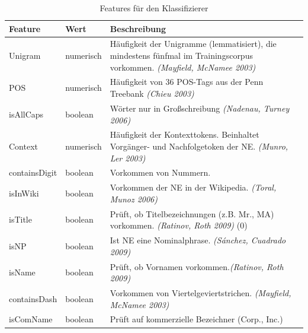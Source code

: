 \documentclass[a4paper, 11pt]{article}
\begin{document}
\begin{table}
 				\begin{tabularx}{\textwidth}{llX}
 					\toprule
 					Feature & Wert & Beschreibung\\
 					\midrule
 					Unigram & numerisch & Häufigkeit der Unigramme (lemmatisiert), die mindestens fünfmal im Trainingscorpus vorkommen. \textit{(Mayfield, McNamee 2003)} \\
 					POS & numerisch  & Häufigkeit von 36 POS-Tags aus der Penn Treebank \textit{(Chieu 2003)} \\
 					isAllCaps & boolean & Wörter nur in Großschreibung \textit{(Nadenau, Turney 2006)} \\
 					Context & numerisch & Häufigkeit der Kontexttokens. Beinhaltet Vorgänger- und Nachfolgetoken der NE. \textit{(Munro, Ler 2003)}  \\
 					containsDigit & boolean & Vorkommen von Nummern. \textit{}\\
 					isInWiki & boolean & Vorkommen der NE in der Wikipedia. \textit{(Toral, Munoz 2006)} \\
 							isTitle & boolean & Prüft, ob Titelbezeichnungen (z.B. Mr., MA) vorkommen. \textit{(Ratinov, Roth 2009)} (0)\\
 							isNP & boolean & Ist NE eine Nominalphrase. \textit{(Sánchez, Cuadrado 2009)} \\
 							isName & boolean & Prüft, ob Vornamen vorkommen.\textit{(Ratinov, Roth 2009)} \\
 							containsDash & boolean & Vorkommen von Viertelgeviertstrichen. \textit{(Mayfield, McNamee 2003)}  \\
isComName & boolean & Prüft auf kommerzielle Bezeichner (Corp., Inc.) \\
 					\bottomrule
 				\end{tabularx}
 				\caption{Features für den Klassifizierer}
 				\label{tab:allf1}
\end{table}
\end{document}
